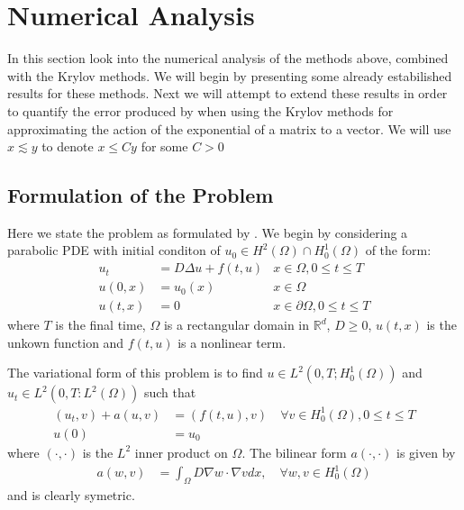 \section{Numerical Analysis}

In this section look into the numerical analysis of the methods above, combined with the Krylov methods.
We will begin by presenting some already estabilished results for these methods.
Next we will attempt to extend these results in order to quantify the error produced by when using the Krylov methods for approximating the action of the exponential of a matrix to a vector.
We will use $x \lesssim y$ to denote $x \leq C y$ for some $C>0$
\subsection{Formulation of the Problem}
Here we state the problem as formulated by \cite{Huang2022}.
We begin by considering a parabolic PDE with initial conditon of $u_0 \in H^2(\Omega) \cap H^1_0(\Omega)$ of the form:
\begin{align*}
    u_t &= D \Delta u + f(t,u) &x\in \Omega, 0 \leq t \leq T\\
    u(0,x) &= u_0(x) &x\in \Omega\\
    u(t,x) &= 0 &x\in \partial \Omega, 0 \leq t \leq T
\end{align*}
where $T$ is the final time, $\Omega$ is a rectangular domain in $\mathbb{R}^d$, $D\geq 0$, $u(t,x)$ is the unkown function and $f(t,u)$ is a nonlinear term.

The variational form of this problem is to find $u\in L^2(0,T;H^1_0(\Omega))$ and $u_t \in L^2(0,T: L^2(\Omega))$ such that
\begin{align*}
    (u_t, v) + a(u, v) &= (f(t,u),v) \quad \forall v \in H^1_0(\Omega), 0\leq t \leq T\\
    u(0) &= u_0
\end{align*}
where $(\cdot,\cdot)$ is the $L^2$ inner product on $\Omega$.
The bilinear form $a(\cdot,\cdot)$ is given by
\begin{align*}
    a(w,v) &= \int_{\Omega} D \nabla w \cdot \nabla v dx, \quad \forall w, v \in H^1_0(\Omega)
\end{align*}
and is clearly symetric.

